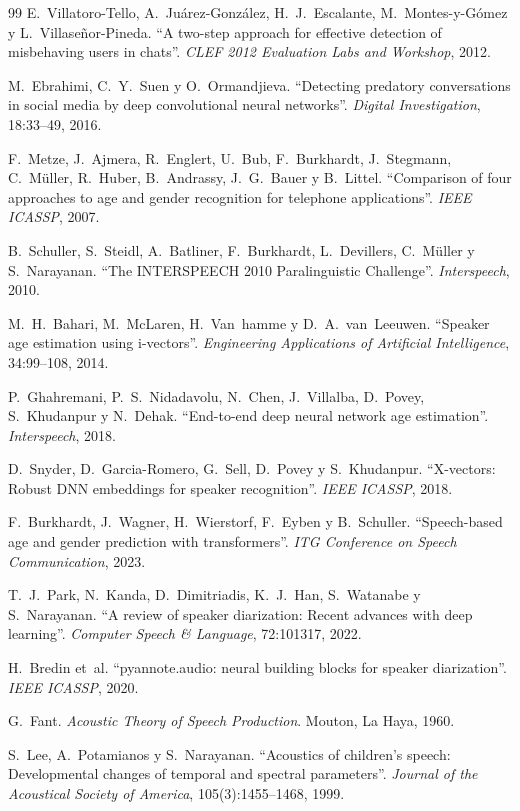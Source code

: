 \documentclass[11pt,a4paper]{article}
\begin{document}
\begin{thebibliography}{99}
 E.~Villatoro-Tello, A.~Juárez-González, H.~J.~Escalante, M.~Montes-y-Gómez y L.~Villaseñor-Pineda. ``A two-step approach for effective detection of misbehaving users in chats''. \emph{CLEF 2012 Evaluation Labs and Workshop}, 2012.

 M.~Ebrahimi, C.~Y.~Suen y O.~Ormandjieva. ``Detecting predatory conversations in social media by deep convolutional neural networks''. \emph{Digital Investigation}, 18:33--49, 2016.

 F.~Metze, J.~Ajmera, R.~Englert, U.~Bub, F.~Burkhardt, J.~Stegmann, C.~Müller, R.~Huber, B.~Andrassy, J.~G.~Bauer y B.~Littel. ``Comparison of four approaches to age and gender recognition for telephone applications''. \emph{IEEE ICASSP}, 2007.

 B.~Schuller, S.~Steidl, A.~Batliner, F.~Burkhardt, L.~Devillers, C.~Müller y S.~Narayanan. ``The INTERSPEECH 2010 Paralinguistic Challenge''. \emph{Interspeech}, 2010.

 M.~H.~Bahari, M.~McLaren, H.~Van~hamme y D.~A.~van~Leeuwen. ``Speaker age estimation using i-vectors''. \emph{Engineering Applications of Artificial Intelligence}, 34:99--108, 2014.

 P.~Ghahremani, P.~S.~Nidadavolu, N.~Chen, J.~Villalba, D.~Povey, S.~Khudanpur y N.~Dehak. ``End-to-end deep neural network age estimation''. \emph{Interspeech}, 2018.

 D.~Snyder, D.~Garcia-Romero, G.~Sell, D.~Povey y S.~Khudanpur. ``X-vectors: Robust DNN embeddings for speaker recognition''. \emph{IEEE ICASSP}, 2018.

 F.~Burkhardt, J.~Wagner, H.~Wierstorf, F.~Eyben y B.~Schuller. ``Speech-based age and gender prediction with transformers''. \emph{ITG Conference on Speech Communication}, 2023.

 T.~J.~Park, N.~Kanda, D.~Dimitriadis, K.~J.~Han, S.~Watanabe y S.~Narayanan. ``A review of speaker diarization: Recent advances with deep learning''. \emph{Computer Speech \& Language}, 72:101317, 2022.

 H.~Bredin et~al. ``pyannote.audio: neural building blocks for speaker diarization''. \emph{IEEE ICASSP}, 2020.

 G.~Fant. \emph{Acoustic Theory of Speech Production}. Mouton, La Haya, 1960.

 S.~Lee, A.~Potamianos y S.~Narayanan. ``Acoustics of children's speech: Developmental changes of temporal and spectral parameters''. \emph{Journal of the Acoustical Society of America}, 105(3):1455--1468, 1999.


\end{thebibliography}
\end{document}
